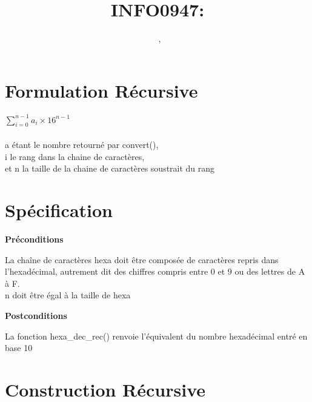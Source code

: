 \documentclass[a4paper, 11pt, oneside]{article}
\title{INFO0947: \intitule}
\author{\textsc{\Prenom}~\textsc{\Nom}, \matricule}
\date{}
\newcommand{\tablemat}{~}
\renewcommand{\tablemat}{\tableofcontents}
\begin{document}
\maketitle
\newpage
\tablemat
\newpage


\section{Formulation Récursive}\label{formulation}
%
%

$\sum\limits_{i=0}^{n-1}    a_{i} \times 16^{ n-1}$
\\
\\
a étant le nombre retourné par convert(),\\ i le rang dans la chaine de caractères,\\ et n la taille de la chaine de caractères soustrait du rang



\section{Spécification}\label{specification}
%
%


\begin{flushleft}
    \bf
    Préconditions
\end{flushleft}

La chaîne de caractères hexa doit être composée de caractères repris dans l'hexadécimal, autrement dit des chiffres compris entre 0 et 9 ou des lettres de A à F.
\\
n doit être égal à la taille de hexa
\\


\begin{flushleft}
    \bf
Postconditions
\end{flushleft}

La fonction hexa\_dec\_rec() renvoie l'équivalent du nombre hexadécimal entré en base 10






\section{Construction Récursive}\label{recur}
%
%
\end{document}
